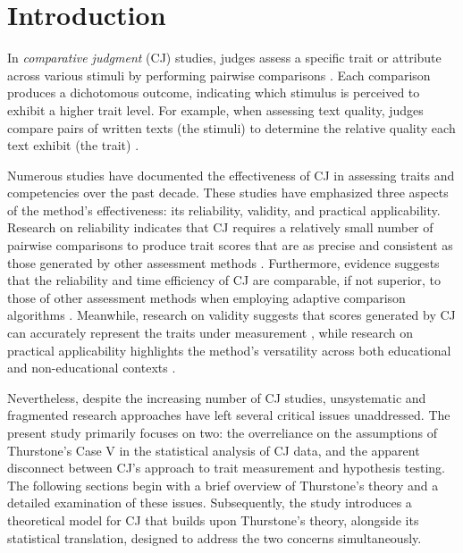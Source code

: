 \documentclass[
  authoryear,
  preprint,
  1p]{elsarticle}
\begin{document}
\section{Introduction}\label{sec-introduction}

In \emph{comparative judgment} (CJ) studies, judges assess a specific
trait or attribute across various stimuli by performing pairwise
comparisons \citep{Thurstone_1927a, Thurstone_1927b}. Each comparison
produces a dichotomous outcome, indicating which stimulus is perceived
to exhibit a higher trait level. For example, when assessing text
quality, judges compare pairs of written texts (the stimuli) to
determine the relative quality each text exhibit (the trait)
\citep{Laming_2004, Pollitt_2012b, Whitehouse_2012, vanDaal_et_al_2016, Lesterhuis_2018_thesis, Coertjens_et_al_2017, Goossens_et_al_2018, Bouwer_et_al_2023}.

Numerous studies have documented the effectiveness of CJ in assessing
traits and competencies over the past decade. These studies have
emphasized three aspects of the method's effectiveness: its reliability,
validity, and practical applicability. Research on reliability indicates
that CJ requires a relatively small number of pairwise comparisons
\citep{Verhavert_et_al_2019, Crompvoets_et_al_2022} to produce trait
scores that are as precise and consistent as those generated by other
assessment methods
\citep{Coertjens_et_al_2017, Goossens_et_al_2018, Bouwer_et_al_2023}.
Furthermore, evidence suggests that the reliability and time efficiency
of CJ are comparable, if not superior, to those of other assessment
methods when employing adaptive comparison algorithms
\citep{Pollitt_2012b, Verhavert_et_al_2022, Mikhailiuk_et_al_2021}.
Meanwhile, research on validity suggests that scores generated by CJ can
accurately represent the traits under measurement
\citep{Whitehouse_2012, vanDaal_et_al_2016, Lesterhuis_2018_thesis, Bartholomew_et_al_2018, Bouwer_et_al_2023},
while research on practical applicability highlights the method's
versatility across both educational and non-educational contexts
\citep{Kimbell_2012, Jones_et_al_2015, Bartholomew_et_al_2018, Jones_et_al_2019, Marshall_et_al_2020, Bartholomew_et_al_2020, Boonen_et_al_2020}.

Nevertheless, despite the increasing number of CJ studies, unsystematic
and fragmented research approaches have left several critical issues
unaddressed. The present study primarily focuses on two: the
overreliance on the assumptions of Thurstone's Case V in the statistical
analysis of CJ data, and the apparent disconnect between CJ's approach
to trait measurement and hypothesis testing. The following sections
begin with a brief overview of Thurstone's theory and a detailed
examination of these issues. Subsequently, the study introduces a
theoretical model for CJ that builds upon Thurstone's theory, alongside
its statistical translation, designed to address the two concerns
simultaneously.
\end{document}
